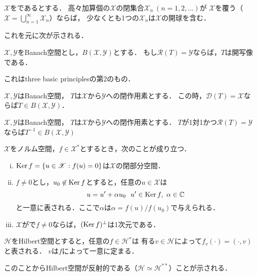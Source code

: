 \documentclass[a4j]{jarticle}
\newcommand{\dom}{\mathscr{D}}
\newcommand{\range}{\mathscr{R}}
\newcommand{\spB}[2]{B(\mathscr{#1}, \mathscr{#2})}
\newcommand{\spX}{\mathscr{X}}
\newcommand{\spY}{\mathscr{Y}}
\begin{document}
    \begin{Them}[定理7.23, p.167, Baireのカテゴリー定理] \label{them7:23}
        $\spX$をであるとする．
        高々加算個の$\spX$の閉集合$\spX_n ~(n=1,2,\dots)$が
        $\spX$を覆う（$\spX=\bigcup_{n=1}^{\infty}{\spX_n}$）ならば，
        少なくとも1つの$\spX_n$は$\spX$の開球を含む．
    \end{Them}
    これを元に次が示される．

    \begin{Them}[定理7.30, p.170, 開写像原理] \label{them7:30}
        $\spX, \spY$をBanach空間とし，$\spB{X}{Y}$とする．
        もし$\range(T)=\spY$ならば，$T$は開写像である．
    \end{Them}
    これはthree basic principlesの第2のもの．

    \begin{Them}[定理7.33, p.172, 閉グラフ定理] \label{them7:33}
        $\spX, \spY$はBanach空間，
        $T$は$\spX$から$\spY$への閉作用素とする．
        この時，$\dom(T)=\spX$ならば$T \in \spB{X}{Y}$．
    \end{Them}

    \begin{Cor}[系7.34, p.172] \label{cor7:34}
        $\spX, \spY$はBanach空間，
        $T$は$\spX$から$\spY$への閉作用素とする．
        $T$が1対1かつ$\range(T)=\spY$ならば$T^{-1} \in \spB{X}{Y}$
    \end{Cor}


    \begin{Them}[定理8.3, p.176] \label{them8:3}
        $\spX$をノルム空間，$f \in \spX^{\ast}$とするとき，次のことが成り立つ．
        \begin{enumerate}[i)]
            \setlength{\leftskip}{5truemm}
            \item $\mKer f=\{ u \in \spX : f(u)=0 \}$は$\spX$の閉部分空間．
            \item $f\neq 0$とし，$u_0 \not \in \operatorname{Ker} f$とすると，任意の$u \in \spX$は
                  \[ u=u'+\alpha u_0 ~~ u' \in \operatorname{Ker} f,~ \alpha \in \mathbb{C} \]
                  と一意に表される．ここで$\alpha$は$\alpha = f(u)/f(u_0)$で与えられる．
              \item $\spX$がで$f \neq 0$ならば，$(\operatorname{Ker} f)^{\perp}$は1次元である．
        \end{enumerate}
    \end{Them}
    \begin{Them}[定理8.5, p.177, Rieszの表現定理] \label{them8:5}
        $\mathscr{H}$をHilbert空間とすると，任意の$f \in \mathscr{H}^{\ast}$は
        有る$v \in \mathscr{H}$によって$f_v(\cdot)=(\cdot,v)$と表される．
        $v$は$f$によって一意に定まる．
    \end{Them}
    このことからHilbert空間が反射的である（$\mathscr{H} \simeq \mathscr{H}^{\ast\ast}$）ことが示される．
\end{document}
